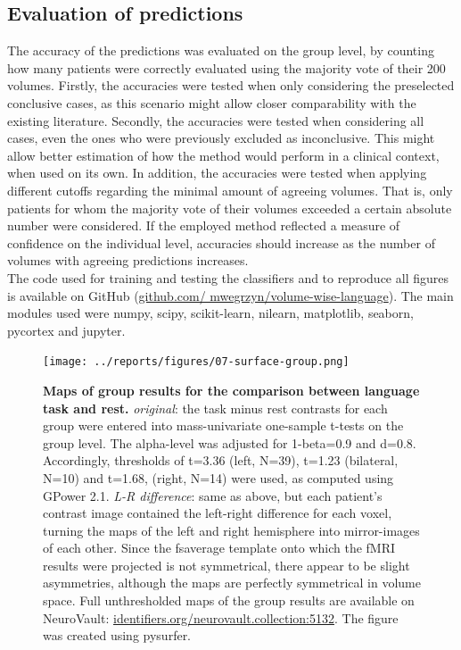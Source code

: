 \documentclass[fleqn,10pt]{SelfArx} %
\begin{document}
\subsection{Evaluation of predictions} \label{Methods: Evaluation of predictions}
The accuracy of the predictions was evaluated on the group level, by counting how many patients were correctly evaluated using the majority vote of their 200 volumes. Firstly, the accuracies were tested when only considering the preselected conclusive cases, as this scenario might allow closer comparability with the existing literature. Secondly, the accuracies were tested when considering all cases, even the ones who were previously excluded as inconclusive. This might allow better estimation of how the method would perform in a clinical context, when used on its own. In addition, the accuracies were tested when applying different cutoffs regarding the minimal amount of agreeing volumes. That is, only patients for whom the majority vote of their volumes exceeded a certain absolute number were considered. If the employed method reflected a measure of confidence on the individual level, accuracies should increase as the number of volumes with agreeing predictions increases.\\
The code used for training and testing the classifiers and to reproduce all figures is available on GitHub (\href{https://github.com/mwegrzyn/volume-wise-language}{github.com/ mwegrzyn/volume-wise-language}). The main modules used were numpy, scipy, scikit-learn, nilearn, matplotlib, seaborn, pycortex and jupyter.


\begin{figure}[htbp]
	\begin{minipage}{\textwidth}
		\renewcommand{\familydefault}{\sfdefault}\normalfont
		\centering
		\texttt{[image: ../reports/figures/07-surface-group.png]}
		\caption{\textbf{Maps of group results for the comparison between language task and rest.} 
			\textit{original}: the task minus rest contrasts for each group were entered into mass-univariate one-sample t-tests on the group level. The alpha-level was adjusted for 1-beta=0.9 and d=0.8. Accordingly, thresholds of t=3.36 (left, N=39), t=1.23 (bilateral, N=10) and t=1.68, (right, N=14) were used, as computed using GPower 2.1. 
			\textit{L-R difference}: same as above, but each patient’s contrast image contained the left-right difference for each voxel, turning the maps of the left and right hemisphere into mirror-images of each other. Since the fsaverage template onto which the fMRI results were projected is not symmetrical, there appear to be slight asymmetries, although the maps are perfectly symmetrical in volume space. Full unthresholded maps of the group results are available on NeuroVault: \href{https://identifiers.org/neurovault.collection:5132}{identifiers.org/neurovault.collection:5132}. The figure was created using pysurfer.}%
		\label{fig:brain}
	\end{minipage}
\end{figure}
\end{document}
